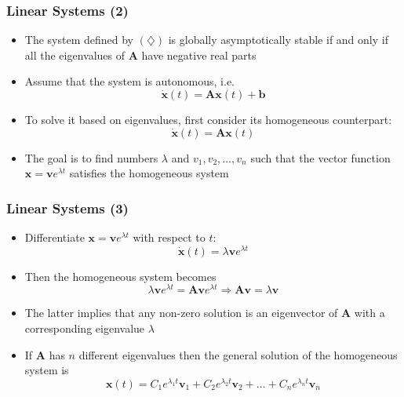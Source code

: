 \documentclass[10pt,usenames,dvipsnames]{beamer}
\theoremstyle{definition}
\begin{document}
\begin{frame}[fragile]
	\frametitle{Linear Systems (2)}
	\begin{itemize}
		\item The system defined by $ (\diamondsuit) $ is globally asymptotically stable if and only if all the eigenvalues of $ \mathbf{A} $ have negative real parts
		
		\item Assume that the system is autonomous, i.e.
		\[
			\dot{\mathbf{x}}(t) = \mathbf{A}\mathbf{x}(t) + \mathbf{b}
		\]
		
		\item To solve it based on eigenvalues, first consider its homogeneous counterpart:
		\[
			\dot{\mathbf{x}}(t) = \mathbf{A}\mathbf{x}(t)
		\]
		
		\item The goal is to find numbers $ \lambda $ and $ v_{1}, v_{2},\ldots,v_{n} $ such that the vector function $ \mathbf{x} = \mathbf{v}e^{\lambda t} $ satisfies the homogeneous system
	\end{itemize}
\end{frame}

\begin{frame}[fragile]
	\frametitle{Linear Systems (3)}
	\begin{itemize}
		\item Differentiate $ \mathbf{x} = \mathbf{v}e^{\lambda t} $ with respect to $ t $:
		\[
			\dot{\mathbf{x}}(t) = \lambda\mathbf{v}e^{\lambda t}
		\]
		
		\item Then the homogeneous system becomes
		\[
			\lambda\mathbf{v}e^{\lambda t} = \mathbf{A} \mathbf{v}e^{\lambda t}  \Rightarrow \mathbf{A} \mathbf{v} = \lambda\mathbf{v} 
		\]
		
		\item The latter implies that any non-zero solution is an eigenvector of $ \mathbf{A} $ with a corresponding eigenvalue $ \lambda $
		
		\item If $ \mathbf{A} $ has $ n $ different eigenvalues then the general solution of the homogeneous system is
		\[
			\mathbf{x}(t) = C_{1}e^{\lambda_{1}t}\mathbf{v}_{1} + C_{2}e^{\lambda_{2}t}\mathbf{v}_{2} + \ldots +  C_{n}e^{\lambda_{n}t}\mathbf{v}_{n}
		\]
	\end{itemize}
\end{frame}
\end{document}
